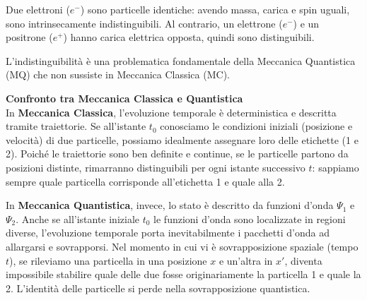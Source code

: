 \begin{example}
    Due elettroni ($e^-$) sono particelle identiche: avendo massa, carica e spin uguali, sono intrinsecamente indistinguibili.
    Al contrario, un elettrone ($e^-$) e un positrone ($e^+$) hanno carica elettrica opposta, quindi sono distinguibili.
\end{example}

\begin{remark}
    L'indistinguibilità è una problematica fondamentale della Meccanica Quantistica (MQ) che non sussiste in Meccanica Classica (MC).
\end{remark}

\textbf{Confronto tra Meccanica Classica e Quantistica}\\
In \textbf{Meccanica Classica}, l'evoluzione temporale è deterministica e descritta tramite traiettorie. Se all'istante $t_0$ conosciamo le condizioni iniziali (posizione e velocità) di due particelle, possiamo idealmente assegnare loro delle etichette (1 e 2). Poiché le traiettorie sono ben definite e continue, se le particelle partono da posizioni distinte, rimarranno distinguibili per ogni istante successivo $t$: sappiamo sempre quale particella corrisponde all'etichetta 1 e quale alla 2.

In \textbf{Meccanica Quantistica}, invece, lo stato è descritto da funzioni d'onda $\Psi_1$ e $\Psi_2$. Anche se all'istante iniziale $t_0$ le funzioni d'onda sono localizzate in regioni diverse, l'evoluzione temporale porta inevitabilmente i pacchetti d'onda ad allargarsi e sovrapporsi.
Nel momento in cui vi è sovrapposizione spaziale (tempo $t$), se rileviamo una particella in una posizione $x$ e un'altra in $x'$, diventa impossibile stabilire quale delle due fosse originariamente la particella 1 e quale la 2. L'identità delle particelle si perde nella sovrapposizione quantistica.

